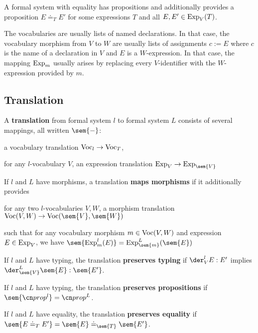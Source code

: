 \begin{definition}
A formal system with equality has propositions and additionally provides a proposition $E\doteq_T E'$ for some expressions $T$ and all $E,E'\in\mathrm{Exp}_V(T)$.
\end{definition}

The vocabularies are usually lists of named declarations.
In that case, the vocabulary morphism from $V$ to $W$ are usually lists of assignments $c:=E$ where $c$ is the name of a declaration in $V$ and $E$ is a $W$-expression.
In that case, the mapping $\mathrm{Exp}_m$ usually arises by replacing every $V$-identifier with the $W$-expression provided by $m$.

\subsection{Translation}

\begin{definition}\label{def:css}
A \textbf{translation} from formal system $l$ to formal system $L$ consists of several mappings, all written $\sem{-}$:
\begin{compactitem}
 \item a vocabulary translation $\mathrm{Voc}_l\to \mathrm{Voc}_T$,
 \item for any $l$-vocabulary $V$, an expression translation $\Exp_V\to \Exp_{\sem{V}}$
\end{compactitem}

If $l$ and $L$ have morphisms, a translation \textbf{maps morphisms} if it additionally provides
\begin{compactitem}
 \item for any two $l$-vocabularies $V,W$, a morphism translation $\VocM(V,W)\to \VocM(\sem{V},\sem{W})$
 \item such that for any vocabulary morphism $m\in\mathrm{Voc}(V,W)$ and expression $E\in\mathrm{Exp}_V$, we have $\sem{\Exp^l_m(E)}=\Exp^L_{\sem{m}}(\sem{E})$
\end{compactitem}

If $l$ and $L$ have typing, the translation \textbf{preserves typing} if $\der^l_V E:E'$ implies $\der^L_{\sem{V}}\sem{E}:\sem{E'}$.

If $l$ and $L$ have typing, the translation \textbf{preserves propositions} if $\sem{\prop^l}=\prop^L$.

If $l$ and $L$ have equality, the translation \textbf{preserves equality} if $\sem{E\doteq_T E'}=\sem{E}\doteq_{\sem{T}}\sem{E'}$.
\end{definition}

